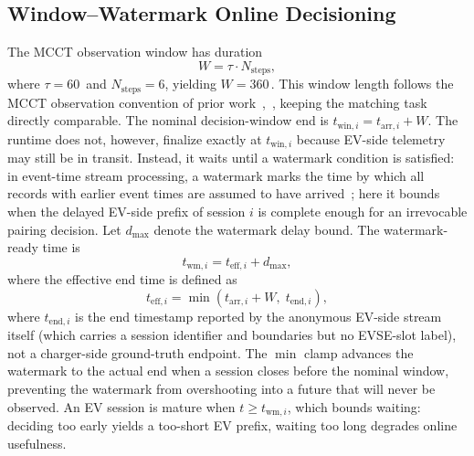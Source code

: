 \documentclass{ieeeaccess}
\begin{document}
    \subsection{Window--Watermark Online Decisioning}
    The MCCT observation window has duration
    \begin{equation}\label{eq:e1}
        W = \tau \cdot N_{\text{steps}},
    \end{equation}
    where $\tau = 60$\, and $N_{\text{steps}} = 6$, yielding $W = 360$\,.
    This window length follows the MCCT observation convention of prior work~\cite{b13},~\cite{b14}, keeping the matching task directly comparable.
    The nominal decision-window end is $t_{\text{win},i} = t_{\text{arr},i} + W$.
    The runtime does not, however, finalize exactly at $t_{\text{win},i}$ because EV-side telemetry may still be in transit.
    Instead, it waits until a watermark condition is satisfied: in event-time stream processing, a watermark marks the time by which all records with earlier event times are assumed to have arrived~\cite{b26}; here it bounds when the delayed EV-side prefix of session $i$ is complete enough for an irrevocable pairing decision.
    Let $d_{\max}$ denote the watermark delay bound.
    The watermark-ready time is
    \begin{equation}\label{eq:e2}
        t_{\text{wm},i} = t_{\text{eff},i} + d_{\max},
    \end{equation}
    where the effective end time is defined as
    \begin{equation}\label{eq:e3}
        t_{\text{eff},i} = \min\!\left(t_{\text{arr},i} + W,\; t_{\text{end},i}\right),
    \end{equation}
    where $t_{\text{end},i}$ is the end timestamp reported by the anonymous EV-side stream itself (which carries a session identifier and boundaries but no EVSE-slot label), not a charger-side ground-truth endpoint. The $\min$ clamp advances the watermark to the actual end when a session closes before the nominal window, preventing the watermark from overshooting into a future that will never be observed.
    An EV session is mature when $t \geq t_{\text{wm},i}$, which bounds waiting: deciding too early yields a too-short EV prefix, waiting too long degrades online usefulness.
\end{document}
